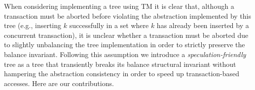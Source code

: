 % 


When considering implementing a tree using TM it is clear that, although a transaction must be aborted before violating 
the abstraction implemented by this tree
(e.g., inserting $k$ successfully in a set where $k$ has already been inserted by a concurrent transaction),
it is unclear whether a transaction must be aborted due to
slightly unbalancing the tree implementation in order to strictly preserve the balance invariant.
Following this assumption we introduce a \emph{speculation-friendly} tree as a tree that transiently breaks its
balance structural invariant without hampering the abstraction consistency in order to speed up transaction-based accesses. 
Here are our contributions.

